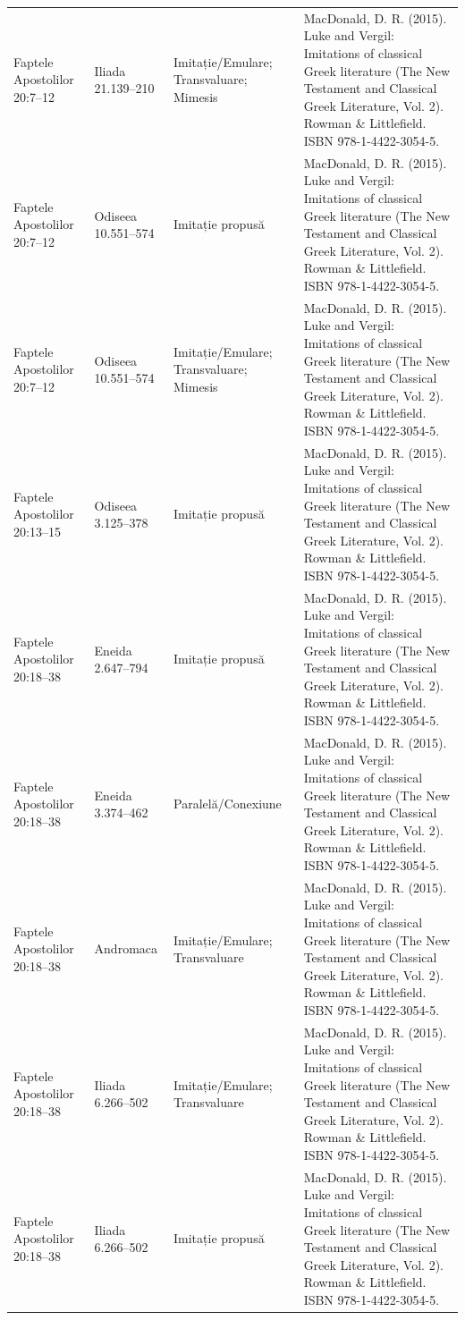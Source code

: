 \documentclass[12pt,a4paper,twoside,openany]{book}
\begin{document}
\begin{longtable}{L{1.4cm}L{1.7cm}L{3.1cm}L{8.4cm}}
Faptele Apostolilor 20:7–12 & Iliada 21.139–210 & Imitație/Emulare; Transvaluare; Mimesis & MacDonald, D. R. (2015). Luke and Vergil: Imitations of classical Greek literature (The New Testament and Classical Greek Literature, Vol. 2). Rowman \& Littlefield. ISBN 978-1-4422-3054-5. \\
Faptele Apostolilor 20:7–12 & Odiseea 10.551–574 & Imitație propusă & MacDonald, D. R. (2015). Luke and Vergil: Imitations of classical Greek literature (The New Testament and Classical Greek Literature, Vol. 2). Rowman \& Littlefield. ISBN 978-1-4422-3054-5. \\
Faptele Apostolilor 20:7–12 & Odiseea 10.551–574 & Imitație/Emulare; Transvaluare; Mimesis & MacDonald, D. R. (2015). Luke and Vergil: Imitations of classical Greek literature (The New Testament and Classical Greek Literature, Vol. 2). Rowman \& Littlefield. ISBN 978-1-4422-3054-5. \\
Faptele Apostolilor 20:13–15 & Odiseea 3.125–378 & Imitație propusă & MacDonald, D. R. (2015). Luke and Vergil: Imitations of classical Greek literature (The New Testament and Classical Greek Literature, Vol. 2). Rowman \& Littlefield. ISBN 978-1-4422-3054-5. \\
Faptele Apostolilor 20:18–38 & Eneida 2.647–794 & Imitație propusă & MacDonald, D. R. (2015). Luke and Vergil: Imitations of classical Greek literature (The New Testament and Classical Greek Literature, Vol. 2). Rowman \& Littlefield. ISBN 978-1-4422-3054-5. \\
Faptele Apostolilor 20:18–38 & Eneida 3.374–462 & Paralelă/Conexiune & MacDonald, D. R. (2015). Luke and Vergil: Imitations of classical Greek literature (The New Testament and Classical Greek Literature, Vol. 2). Rowman \& Littlefield. ISBN 978-1-4422-3054-5. \\
Faptele Apostolilor 20:18–38 & Andromaca & Imitație/Emulare; Transvaluare & MacDonald, D. R. (2015). Luke and Vergil: Imitations of classical Greek literature (The New Testament and Classical Greek Literature, Vol. 2). Rowman \& Littlefield. ISBN 978-1-4422-3054-5. \\
Faptele Apostolilor 20:18–38 & Iliada 6.266–502 & Imitație/Emulare; Transvaluare & MacDonald, D. R. (2015). Luke and Vergil: Imitations of classical Greek literature (The New Testament and Classical Greek Literature, Vol. 2). Rowman \& Littlefield. ISBN 978-1-4422-3054-5. \\
Faptele Apostolilor 20:18–38 & Iliada 6.266–502 & Imitație propusă & MacDonald, D. R. (2015). Luke and Vergil: Imitations of classical Greek literature (The New Testament and Classical Greek Literature, Vol. 2). Rowman \& Littlefield. ISBN 978-1-4422-3054-5. \\

\end{longtable}
\end{document}
